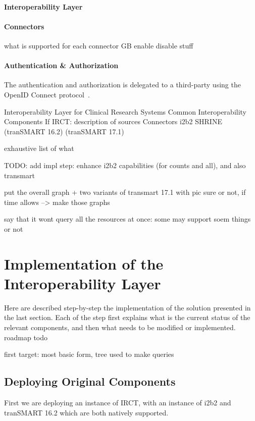 \paragraph{Interoperability Layer}

\paragraph{Connectors}
what is supported for each connector
GB enable disable stuff

\paragraph{Authentication \& Authorization}
The authentication and authorization is delegated to a third-party using the OpenID Connect protocol~\cite{openidconnect}.





Interoperability Layer for Clinical Research Systems
Common Interoperability Components
If IRCT: description of sources
Connectors
i2b2
SHRINE
(tranSMART 16.2)
(tranSMART 17.1)

exhaustive list of what

TODO: add impl step: enhance i2b2 capabilities (for counts and all), and also transmart



put the overall graph + two variants of transmart 17.1 with pic sure or not, if time allows
--> make those graphs

say that it wont query all the resources at once: some may support soem things or not 


\section{Implementation of the Interoperability Layer}
Here are described step-by-step the implementation of the solution presented in the last section. 
Each of the step first explains what is the current status of the relevant components, and then what needs to be modified or implemented.
roadmap todo


first target: most basic form, tree used to make queries


\subsection{Deploying Original Components}
First we are deploying an instance of IRCT, with an instance of i2b2 and tranSMART 16.2 which are both natively supported. 

